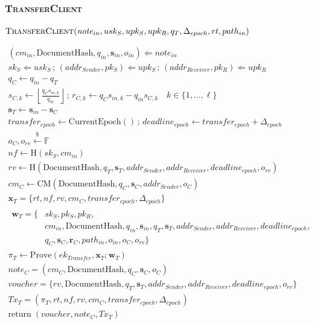 \documentclass[11pt,a4paper]{extarticle}
\newcommand{\CM}{\mathrm{CM}}
\newcommand{\Hash}{\mathrm{H}}
\newcommand{\Prove}{\mathrm{Prove}}
\newcommand{\sample}{\xleftarrow{\$}}
\newcommand{\DocumentHash}{\mathrm{DocumentHash}}
\newcommand{\addrSender}{addr_{Sender}}
\newcommand{\addrReceiver}{addr_{Receiver}}
\newcommand{\DeltaEpoch}{\Delta_{epoch}}
\newcommand{\Return}{\mathrm{return}\;}
\newcommand{\CurrentEpoch}{\mathrm{CurrentEpoch}}
\newenvironment{schemeblock}
{%
  \begingroup
  \setlength{\jot}{8pt}%
  \setlength{\parskip}{0pt}%
  \setlength{\abovedisplayskip}{9pt}%
  \setlength{\belowdisplayskip}{0pt}%
  \setlength{\abovedisplayshortskip}{9pt}%
  \setlength{\belowdisplayshortskip}{0pt}%
  \begin{mdframed}[
    linewidth=0.4pt,
    linecolor=black,
    innerleftmargin=8pt,
    innerrightmargin=8pt,
    innertopmargin=8pt,
    innerbottommargin=8pt,
    skipabove=0pt,
    skipbelow=5pt,
    splittopskip=8pt,
    splitbottomskip=8pt
  ]
  \centering
}
{%
  \end{mdframed}
  \endgroup
}
\begin{document}
\subsubsection{\textsc{TransferClient}}

\begin{schemeblock}
\(
  \textsc{TransferClient}(
    \mathit{note}_{in},usk_S,upk_S,upk_R,
    q_T,\DeltaEpoch,rt,path_{in})
\)

\begin{gather*}
(cm_{in},\DocumentHash,q_{in},\mathbf{s}_{in},o_{in})
  \Leftarrow
  \mathit{note}_{in}
  \\
sk_S\Leftarrow usk_S
  \,;\,
  (\addrSender,pk_S)\Leftarrow upk_S
  \,;\,
  (\addrReceiver,pk_R)\Leftarrow upk_R
  \\
q_C\gets q_{in}-q_T
  \\
s_{C,k}\gets
\left\lfloor\frac{q_Cs_{in,k}}{q_{in}}\right\rfloor
  \,;\,
r_{C,k}\gets q_Cs_{in,k}-q_{in}s_{C,k}
  \quad k\in\{1,\ldots,\ell\}
  \\
\mathbf{s}_T\gets\mathbf{s}_{in}-\mathbf{s}_C
  \\
transfer_{epoch}\gets\CurrentEpoch()
  \,;\,
deadline_{epoch}\gets transfer_{epoch}+\DeltaEpoch
  \\
o_C,o_{rv}\sample\mathbb{F}
  \\
nf\gets\Hash(sk_S,cm_{in})
  \\
rv\gets
  \Hash(
    \DocumentHash,q_T,\mathbf{s}_T,
    \addrSender,\addrReceiver,deadline_{epoch},o_{rv}
  )
  \\
cm_C\gets
  \CM(\DocumentHash,q_C,\mathbf{s}_C,\addrSender,o_C)
  \\
\mathbf{x}_T=\{
  rt,nf,rv,cm_C,transfer_{epoch},\DeltaEpoch\}
  \\
\begin{aligned}
  \mathbf{w}_T=\{
    &sk_S,pk_S,pk_R,\\
    &cm_{in},\DocumentHash,q_{in},\mathbf{s}_{in},
    q_T,\mathbf{s}_T,\addrSender,\addrReceiver,deadline_{epoch},\\
    &q_C,\mathbf{s}_C,\mathbf{r}_C,path_{in},
    o_{in},o_C,o_{rv}\}
  \end{aligned}
  \\
\pi_T\gets
  \Prove(ek_{Transfer},\mathbf{x}_T;\mathbf{w}_T)
  \\
\mathit{note}_C=(cm_C,\DocumentHash,q_C,\mathbf{s}_C,o_C)
  \\
\mathit{voucher}=\{
    rv,\DocumentHash,q_T,\mathbf{s}_T,
    \addrSender,\addrReceiver,deadline_{epoch},o_{rv}\}
  \\
\mathit{Tx}_T=(
  \pi_T,rt,nf,rv,cm_C,transfer_{epoch},\DeltaEpoch)
  \\
\Return(\mathit{voucher},\mathit{note}_C,\mathit{Tx}_T)
\end{gather*}
\end{schemeblock}
\end{document}

